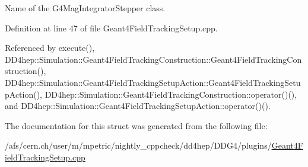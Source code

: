Name of the G4MagIntegratorStepper class. 

Definition at line 47 of file Geant4FieldTrackingSetup.cpp.

Referenced by execute(), DD4hep::Simulation::Geant4FieldTrackingConstruction::Geant4FieldTrackingConstruction(), DD4hep::Simulation::Geant4FieldTrackingSetupAction::Geant4FieldTrackingSetupAction(), DD4hep::Simulation::Geant4FieldTrackingConstruction::operator()(), and DD4hep::Simulation::Geant4FieldTrackingSetupAction::operator()().

The documentation for this struct was generated from the following file:\begin{DoxyCompactItemize}
\item 
/afs/cern.ch/user/m/mpetric/nightly\_\-cppcheck/dd4hep/DDG4/plugins/\hyperlink{_geant4_field_tracking_setup_8cpp}{Geant4FieldTrackingSetup.cpp}\end{DoxyCompactItemize}
